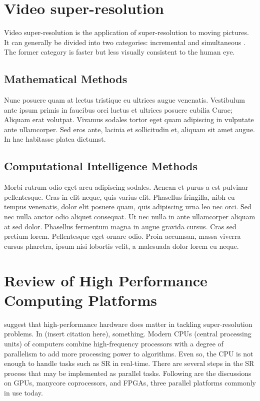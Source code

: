 
\section{Video super-resolution}

Video super-resolution is the application of super-resolution to moving pictures.
It can generally be divided into two categories: incremental and simultaneous \citep{Su2011}. The former category is faster but less visually consistent to the human eye.


\subsection{Mathematical Methods}

Nunc posuere quam at lectus tristique eu ultrices augue venenatis. Vestibulum ante ipsum primis in faucibus orci luctus et ultrices posuere cubilia Curae; Aliquam erat volutpat. Vivamus sodales tortor eget quam adipiscing in vulputate ante ullamcorper. Sed eros ante, lacinia et sollicitudin et, aliquam sit amet augue. In hac habitasse platea dictumst.


\subsection{Computational Intelligence Methods}
Morbi rutrum odio eget arcu adipiscing sodales. Aenean et purus a est pulvinar pellentesque. Cras in elit neque, quis varius elit. Phasellus fringilla, nibh eu tempus venenatis, dolor elit posuere quam, quis adipiscing urna leo nec orci. Sed nec nulla auctor odio aliquet consequat. Ut nec nulla in ante ullamcorper aliquam at sed dolor. Phasellus fermentum magna in augue gravida cursus. Cras sed pretium lorem. Pellentesque eget ornare odio. Proin accumsan, massa viverra cursus pharetra, ipsum nisi lobortis velit, a malesuada dolor lorem eu neque.

\section{Review of High Performance Computing Platforms}
\cite{Yang2010a} suggest that high-performance hardware does matter in tackling super-resolution problems. In (insert citation here), something. 
Modern CPUs (central processing units) of computers combine high-frequency processors with a degree of parallelism to add more processing power to algorithms.
Even so, the CPU is not enough to handle tasks such as SR in real-time.
There are several steps in the SR process that may be implemented as parallel tasks.
Following are the discussions on GPUs, manycore coprocessors, and FPGAs, three parallel platforms commonly in use today.

